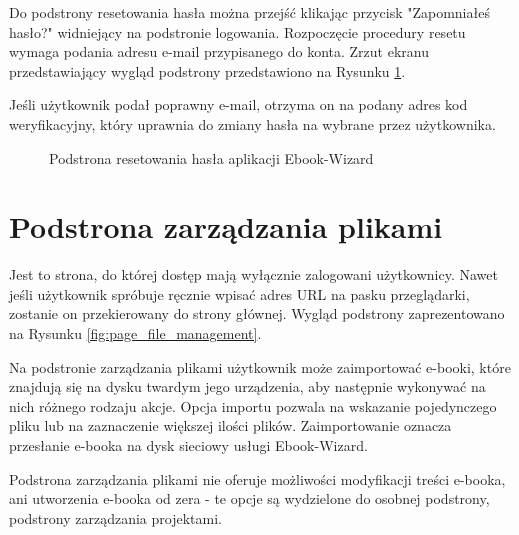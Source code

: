 Do podstrony resetowania hasła można przejść klikając przycisk "Zapomniałeś hasło?" widniejący na podstronie logowania. Rozpoczęcie procedury resetu wymaga podania adresu e-mail przypisanego do konta. Zrzut ekranu przedstawiający wygląd podstrony przedstawiono na Rysunku \ref{fig:page_reset_pw}.

Jeśli użytkownik podał poprawny e-mail, otrzyma on na podany adres kod weryfikacyjny, który uprawnia do zmiany hasła na wybrane przez użytkownika.

\begin{figure}[h]
    \centering
    \setlength{\fboxsep}{0pt}
    \setlength{\fboxrule}{0.4pt}
    \caption{Podstrona resetowania hasła aplikacji Ebook-Wizard}
    \label{fig:page_reset_pw}
\end{figure}

\section{Podstrona zarządzania plikami}

Jest to strona, do której dostęp mają wyłącznie zalogowani użytkownicy. Nawet jeśli użytkownik spróbuje ręcznie wpisać adres URL na pasku przeglądarki, zostanie on przekierowany do strony głównej. Wygląd podstrony zaprezentowano na Rysunku \ref{fig:page_file_management}.

Na podstronie zarządzania plikami użytkownik może zaimportować e-booki, które znajdują się na dysku twardym jego urządzenia, aby następnie wykonywać na nich różnego rodzaju akcje. Opcja importu pozwala na wskazanie pojedynczego pliku lub na zaznaczenie większej ilości plików. Zaimportowanie oznacza przesłanie e-booka na dysk sieciowy usługi Ebook-Wizard.

Podstrona zarządzania plikami nie oferuje możliwości modyfikacji treści e-booka, ani utworzenia e-booka od zera - te opcje są wydzielone do osobnej podstrony, podstrony zarządzania projektami.

